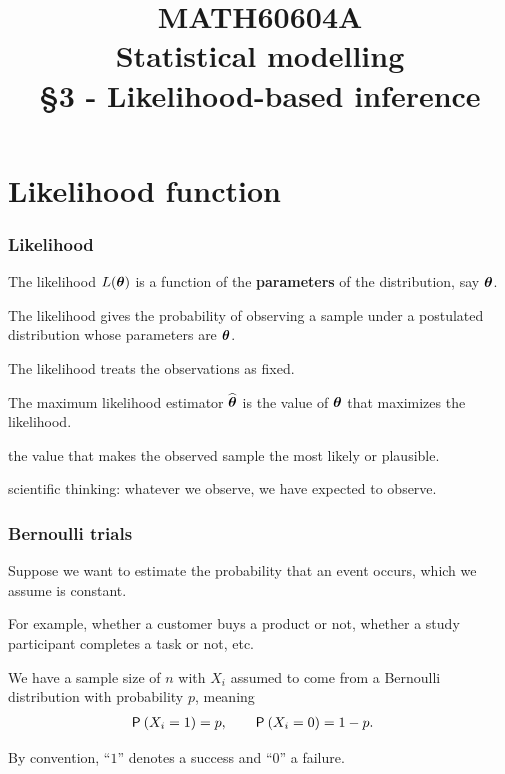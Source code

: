 \documentclass{beamer}
\title[\color{white}{MATH60604A Likelihood-based inference}]{\texorpdfstring{MATH60604A \\Statistical modelling \\ \S 3 - Likelihood-based inference}{MATH60604A \\Statistical modelling \\ \S~3 - Likelihood-based inference}}
\author{}
\institute{HEC Montréal\\
Department of Decision Sciences}
\date{}
\begin{document}
\frame{\titlepage}
% 
% 
% 
% 
\section{Likelihood function}
\begin{frame}
\frametitle{Likelihood}
\bi

\item The \alert{likelihood} $L(\bs{\theta})$ is a function of the \textbf{parameters} of the distribution, say $\bs{\theta}$.

\bi \item The likelihood  gives the probability of observing a sample under a postulated distribution whose parameters are $\bs{\theta}$.
\item The likelihood treats the observations as fixed.
\ei

\item The \alert{maximum likelihood} estimator $\hat{\bs{\theta}}$ is the value of $\bs{\theta}$ that maximizes the likelihood.
\bi \item the value that makes the observed sample the most \alert{likely} or \alert{plausible}. 
\item scientific thinking: whatever we observe, we have expected to observe.
\ei
\ei
\end{frame}
\begin{frame}
\frametitle{Bernoulli trials}
\bi
\item Suppose we want to estimate the probability that an event occurs, which we assume is constant.
\item For example, whether a customer buys a product or not, whether a study participant completes a task or not, etc.
\item We have a sample size of $n$ with $X_i$ assumed to come from a Bernoulli distribution with probability $p$, meaning 
\begin{align*}
\P{X_i=1}&=p, \qquad \P{X_i=0}=1-p.                                 
\end{align*}

\item By convention, ``$1$'' denotes a success and ``$0$'' a failure.
\ei
\end{frame}
\end{document}
